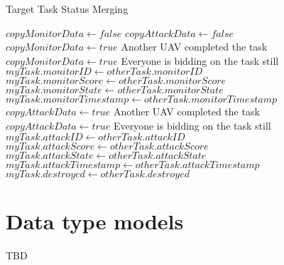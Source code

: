 \begin{algorithm}
	\caption{Target Task Status Merging}
	\label{alg:mergeTaskStatus}
	\begin{algorithmic}[1]
		\State $copyMonitorData\gets false$
		\State $copyAttackData\gets false$
		\\
			\State $copyMonitorData\gets true$
			\Comment Another UAV completed the task
			\State $copyMonitorData\gets true$
			\Comment Everyone is bidding on the task still
		\EndIf
		\\
			\State $myTask.monitorID\gets otherTask.monitorID$
			\State $myTask.monitorScore\gets otherTask.monitorScore$
			\State $myTask.monitorState\gets otherTask.monitorState$
			\State $myTask.monitorTimestamp\gets otherTask.monitorTimestamp$									
		\EndIf
		\\
			\State $copyAttackData\gets true$
			\Comment Another UAV completed the task
			\State $copyAttackData\gets true$
			\Comment Everyone is bidding on the task still
		\EndIf
		\\
			\State $myTask.attackID\gets otherTask.attackID$
			\State $myTask.attackScore\gets otherTask.attackScore$
			\State $myTask.attackState\gets otherTask.attackState$
			\State $myTask.attackTimestamp\gets otherTask.attackTimestamp$
			\State $myTask.destroyed\gets otherTask.destroyed$					
		\EndIf

		\EndFunction
	\end{algorithmic}
\end{algorithm}


\section{Data type models}
TBD
